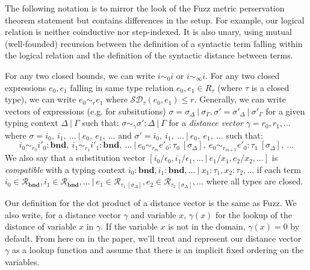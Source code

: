The following notation is to mirror the look of the Fuzz metric perservation
theorem statement but contains differences in the setup. For example, our
logical relation is neither coinductive nor step-indexed. It is also unary,
using mutual (well-founded) recursion between the definition of a syntactic term
falling within the logical relation and the definition of the syntactic distance
between terms.

For any two closed bounds, we can write $i \sim_0 i$ or $i \sim_{\infty} i$. 
For any two closed expressions $e_0, e_1$ falling in same type relation $e_0,
e_1 \in R_\tau$ (where $\tau$ is a closed type), we can write $e_0 \sim_r e_1$
where $\mathcal{SD}_{\tau}(e_0, e_1) \leq r$. 
Generally, we can write vectors of expressions (e.g. for subsitutions) $\sigma =
\sigma_{\Delta} \ | \ \sigma_{\Gamma}, \sigma' = \sigma'_{\Delta} \ | \
\sigma'_{\Gamma}$
for a given typing context $\Delta \ | \ \Gamma$ such that: $\sigma \sim_{\gamma} \sigma'
: \Delta \ | \ \Gamma$ for a \textit{distance vector}
$\gamma = r_0, r_1, \ldots$
where
$\sigma = i_0,~i_1,~\ldots \ | \ e_0,~e_1,~\ldots$ 
and 
$\sigma' = i_0,~i_1,~\ldots \ | \ e_0,~e_1,~\ldots$ 
such that:
$$
i_0 \sim_{r_0} i'_0 : \mathbf{bnd},~i_1 \sim_{r_1} i'_1 : \mathbf{bnd},~\ldots \
| \ e_0 \sim_{r_m} e'_0 :
\tau_0~[\sigma_{\Delta}],~e_0 \sim_{r_{m+1}} e'_0 :
\tau_1~[\sigma_{\Delta}],~\ldots
$$
We also say that a substitution vector $[i_0 / \epsilon_0, i_1 / \epsilon_1, \ldots \ | \ e_1/x_1, e_2/x_2, \ldots]$ is
\textit{compatible} with a typing context 
$i_0 : \mathbf{bnd}, i_1 : \mathbf{bnd}, \ldots \ | \ x_1 : \tau_1, x_2 : \tau_2, \ldots$
if each term 
$i_0 \in \mathcal{R}_{\mathbf{bnd}}, 
i_1 \in \mathcal{R}_{\mathbf{bnd}}, 
\ldots \ | 
\ e_1 \in \mathcal{R}_{\tau_1~[\sigma_{\Delta}]}, 
e_2 \in \mathcal{R}_{\tau_2~[\sigma_{\Delta}]}, \ldots$ where all types are closed.

Our definition for the dot product of a distance vector is the same as Fuzz. We
also write, for a distance vector $\gamma$ and variable $x$, $\gamma(x)$ for the
lookup of the distance of variable $x$ in $\gamma$. If the variable $x$ is not
in the domain, $\gamma(x) = 0$ by default. From here on in the paper, we'll
treat and represent our distance vector $\gamma$ as a lookup function and assume
that there is an implicit fixed ordering on the variables.

